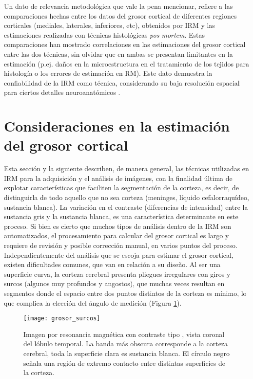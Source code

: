 Un dato de relevancia metodológica que vale la pena mencionar, refiere a las comparaciones hechas
entre los datos del grosor cortical de diferentes regiones corticales (mediales, laterales, inferiores, etc),
obtenidos por IRM y las estimaciones realizadas con técnicas histológicas \textit{pos mortem}. Estas
comparaciones han mostrado correlaciones en las estimaciones del grosor cortical entre las dos
técnicas, sin olvidar que en ambas se presentan limitantes en la estimación (p.ej. daños en la
microestructura en el tratamiento de los tejidos para histología o los errores de estimación en RM). Este
dato demuestra la confiabilidad de la IRM como técnica, considerando su baja resolución espacial para
ciertos detalles neuroanatómicos  \cite{Fatterpekar2002,Fischl1999_cortical}.

\section{Consideraciones en la estimación del grosor cortical} 
Esta sección y la siguiente describen, de manera general, las técnicas utilizadas en IRM para la
adquisición y el análisis de imágenes, con la finalidad última de explotar características que faciliten la
segmentación de la corteza, es decir, de distinguirla de todo aquello que no sea corteza (meninges,
líquido cefalorraquídeo, sustancia blanca). La variación en el contraste (diferencias de intensidad) entre
la sustancia gris y la sustancia blanca, es una característica determinante en este proceso.
Si bien es cierto que muchos tipos de análisis dentro de la IRM son automatizados, el procesamiento
para calcular del grosor cortical es largo y requiere de revisión y posible corrección manual, en varios
puntos del proceso. Independientemente del análisis que se escoja para estimar el grosor cortical,
existen dificultades comunes, que van en relación a su diseño. Al ser una superficie curva, la corteza
cerebral presenta pliegues irregulares con giros y surcos (algunos muy profundos y angostos), que
muchas veces resultan en segmentos donde el espacio entre dos puntos distintos de la corteza es
mínimo, lo que complica la elección del ángulo de medición (Figura \ref{fig:grosor_surcos}).

\begin{figure}[htb]
\begin{figg}
   \texttt{[image: grosor\_surcos]}
   \caption{Imagen por resonancia magnética con contraste tipo \Tone, vista coronal del lóbulo temporal. La banda más obscura corresponde a la corteza cerebral, toda la superficie clara es sustancia blanca. El círculo negro señala una región de extremo contacto entre distintas superficies de la corteza.
}
 \label{fig:grosor_surcos}
 \end{figg}
\end{figure}



